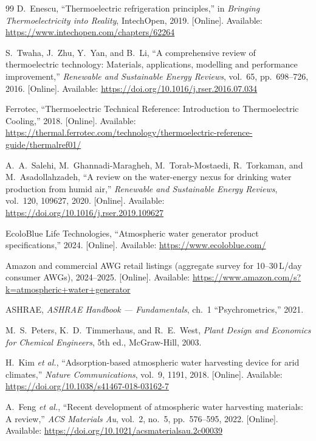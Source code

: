 \documentclass[11pt,a4paper]{article}
\begin{document}
\begin{thebibliography}{99}
D.~Enescu, ``Thermoelectric refrigeration principles,'' in \emph{Bringing Thermoelectricity into Reality}, IntechOpen, 2019. [Online]. Available: \url{https://www.intechopen.com/chapters/62264}

S.~Twaha, J.~Zhu, Y.~Yan, and B.~Li, ``A comprehensive review of thermoelectric technology: Materials, applications, modelling and performance improvement,'' \emph{Renewable and Sustainable Energy Reviews}, vol.~65, pp.~698--726, 2016. [Online]. Available: \url{https://doi.org/10.1016/j.rser.2016.07.034}

Ferrotec, ``Thermoelectric Technical Reference: Introduction to Thermoelectric Cooling,'' 2018. [Online]. Available: \url{https://thermal.ferrotec.com/technology/thermoelectric-reference-guide/thermalref01/}

A.~A.~Salehi, M.~Ghannadi-Maragheh, M.~Torab-Mostaedi, R.~Torkaman, and M.~Asadollahzadeh, ``A review on the water-energy nexus for drinking water production from humid air,'' \emph{Renewable and Sustainable Energy Reviews}, vol.~120, 109627, 2020. [Online]. Available: \url{https://doi.org/10.1016/j.rser.2019.109627}

EcoloBlue Life Technologies, ``Atmospheric water generator product specifications,'' 2024. [Online]. Available: \url{https://www.ecoloblue.com/}

Amazon and commercial AWG retail listings (aggregate survey for 10--30\,L/day consumer AWGs), 2024--2025. [Online]. Available: \url{https://www.amazon.com/s?k=atmospheric+water+generator}

ASHRAE, \emph{ASHRAE Handbook --- Fundamentals}, ch.~1 ``Psychrometrics,'' 2021.

M.~S.~Peters, K.~D.~Timmerhaus, and R.~E.~West, \emph{Plant Design and Economics for Chemical Engineers}, 5th ed., McGraw-Hill, 2003.

H.~Kim \emph{et al.}, ``Adsorption-based atmospheric water harvesting device for arid climates,'' \emph{Nature Communications}, vol.~9, 1191, 2018. [Online]. Available: \url{https://doi.org/10.1038/s41467-018-03162-7}

A.~Feng \emph{et al.}, ``Recent development of atmospheric water harvesting materials: A review,'' \emph{ACS Materials Au}, vol.~2, no.~5, pp.~576--595, 2022. [Online]. Available: \url{https://doi.org/10.1021/acsmaterialsau.2c00039}


\end{thebibliography}
\end{document}
